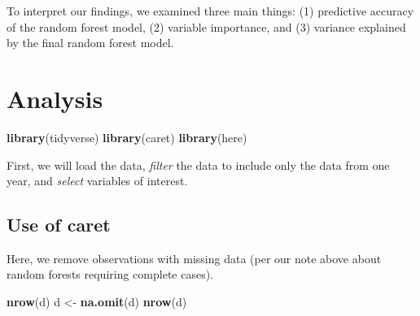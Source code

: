 \documentclass[]{book}
\newenvironment{Shaded}{\begin{snugshade}}{\end{snugshade}}
\newcommand{\KeywordTok}[1]{\textcolor[rgb]{0.13,0.29,0.53}{\textbf{#1}}}
\newcommand{\StringTok}[1]{\textcolor[rgb]{0.31,0.60,0.02}{#1}}
\newcommand{\OperatorTok}[1]{\textcolor[rgb]{0.81,0.36,0.00}{\textbf{#1}}}
\newcommand{\NormalTok}[1]{#1}
\begin{document}
To interpret our findings, we examined three main things: (1) predictive
accuracy of the random forest model, (2) variable importance, and (3)
variance explained by the final random forest model.

\chapter{Analysis}\label{analysis}

\begin{Shaded}
\begin{Highlighting}[]
\KeywordTok{library}\NormalTok{(tidyverse)}
\KeywordTok{library}\NormalTok{(caret)}
\KeywordTok{library}\NormalTok{(here)}
\end{Highlighting}
\end{Shaded}

First, we will load the data, \emph{filter} the data to include only the
data from one year, and \emph{select} variables of interest.

\begin{Shaded}
\end{Shaded}

\section{Use of caret}\label{use-of-caret}

Here, we remove observations with missing data (per our note above about
random forests requiring complete cases).

\begin{Shaded}
\begin{Highlighting}[]
\KeywordTok{nrow}\NormalTok{(d)}
\NormalTok{d <-}\StringTok{ }\KeywordTok{na.omit}\NormalTok{(d)}
\KeywordTok{nrow}\NormalTok{(d)}
\end{Highlighting}
\end{Shaded}
\end{document}
